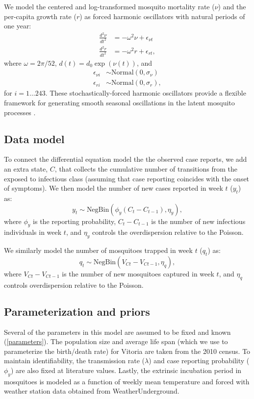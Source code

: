 \documentclass[10pt,letterpaper]{article}
\begin{document}
We model the centered and log-transformed mosquito mortality rate ($\nu$) and the per-capita growth rate ($r$) as forced harmonic oscillators with natural periods of one year:
\begin{align}
\frac{d^2\nu}{dt^2} &= -\omega^2 \nu + \epsilon_{\nu t}\\
\frac{d^2 r}{dt^2} &= -\omega^2 r + \epsilon_{rt},
\end{align}
where $\omega = 2\pi / 52$, $d(t) = d_0 \exp(\nu(t))$, and
\begin{align}
\epsilon_{\nu i} & \sim \text{Normal}(0, \sigma_{\nu})\\
\epsilon_{ri} & \sim \text{Normal}(0, \sigma_r),
\end{align}
for $i = 1 \dots 243$.
These stochastically-forced harmonic oscillators provide a flexible framework for generating smooth seasonal oscillations in the latent mosquito processes \cite{Ramsay2017}.

\subsection*{Data model}

To connect the differential equation model the the observed case reports, we add an extra state, $C$, that collects the cumulative number of transitions from the exposed to infectious class (assuming that case reporting coincides with the onset of symptoms).
We then model the number of new cases reported in week $t$ ($y_t$) as:
\begin{equation}
y_t  \sim \text{NegBin}(\phi_y (C_t - C_{t-1}), \eta_y),
\end{equation}
where $\phi_y$ is the reporting probability, $C_t - C_{t-1}$ is the number of new infectious individuals in week $t$, and $\eta_y$ controls the overdispersion relative to the Poisson.

We similarly model the number of mosquitoes trapped in week $t$ ($q_t$) as:
\begin{equation}
q_t \sim \text{NegBin}(V_{Ct} - V_{Ct-1}, \eta_q),
\end{equation}
where $V_{Ct} - V_{Ct-1}$ is the number of new mosquitoes captured in week $t$, and $\eta_q$ controls overdispersion relative to the Poisson.

\subsection*{Parameterization and priors}

Several of the parameters in this model are assumed to be fixed and known (\ref{parameters}).
The population size and average life span (which we use to parameterize the birth/death rate) for Vitoria are taken from the 2010 census.
To maintain identifiability, the transmission rate ($\lambda$) and case reporting probability ($\phi_y$) are also fixed at literature values.
Lastly, the extrinsic incubation period in mosquitoes is modeled as a function of weekly mean temperature and forced with weather station data obtained from WeatherUnderground.
\end{document}
